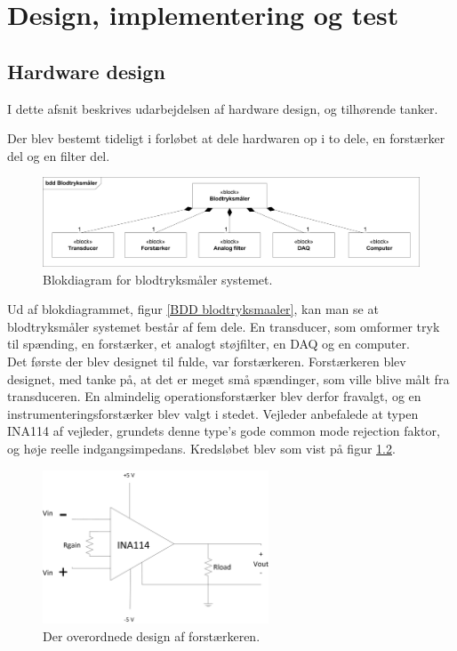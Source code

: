 \chapter{Design, implementering og test}
   
\section{Hardware design}
I dette afsnit beskrives udarbejdelsen af hardware design, og tilhørende tanker.

Der blev bestemt tideligt i forløbet at dele hardwaren op i to dele, en forstærker del og en filter del. 
\\
\begin{figure}[H]
	\centering
	\includegraphics[width=1\textwidth]{Figurer/Hardware/BDD1}
	\caption{Blokdiagram for blodtryksmåler systemet.}
	\label{rBDD blodtryksmaaler}
\end{figure}

Ud af blokdiagrammet, figur \ref{BDD blodtryksmaaler}, kan man se at blodtryksmåler systemet består af fem dele. En transducer, som omformer tryk til spænding, en forstærker, et analogt støjfilter, en DAQ og en computer. \\

Det første der blev designet til fulde, var forstærkeren. Forstærkeren blev designet, med tanke på, at det er meget små spændinger, som ville blive målt fra transduceren. En almindelig operationsforstærker blev derfor fravalgt, og en instrumenteringsforstærker blev valgt i stedet. Vejleder anbefalede at typen INA114 af vejleder, grundets denne type's gode common mode rejection faktor, og høje reelle indgangsimpedans. Kredsløbet blev som vist på figur \ref{forstkreds}. \\

\begin{figure}[H]
	\centering
	\includegraphics[width=0.6\textwidth]{Figurer/Hardware/Forstaerker}
	\caption{Der overordnede design af forstærkeren.}
	\label{forstkreds}
\end{figure}

